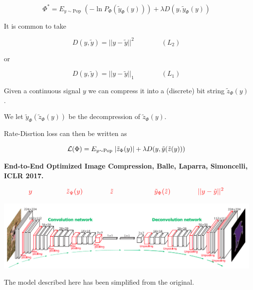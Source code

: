 {

$$\Phi^* = E_{y \sim \mathrm{Pop}}\;(- \ln P_\Phi(\tilde{y}_\Phi(y))) + \lambda D(y,\tilde{y}_\Phi(y))$$

\vfill
It is common to take

$$D(y,\tilde{y}) = ||y-\tilde{y}||^2 \hspace{4em}(L_2)$$

\vfill
or

$$D(y,\tilde{y}) = ||y-\tilde{y}||_1 \hspace{4em} (L_1)$$


Given a continuous signal $y$ we can compress it into a (discrete) bit string $\tilde{z}_\Phi(y)$.

\vfill
We let $\tilde{y}_\Phi(\tilde{z}_\Phi(y))$ be the decompression of $\tilde{z}_\Phi(y)$.

\vfill
Rate-Disrtion loss can then be written as

$${\cal L}(\Phi) = E_{y \sim \mathrm{Pop}}\;|\tilde{z}_\Phi(y)| + \lambda D(y,\tilde{y}(\tilde{z}(y)))$$


{\bf End-to-End Optimized Image Compression, Balle, Laparra, Simoncelli, ICLR 2017.}


\vfill
$${\color{red}y \hspace{5em}  \tilde{z}_\Psi(y) \hspace{4em} \tilde{z} \hspace{6em} \tilde{y}_\Phi(\tilde{z}) \hspace{4em}||y - \tilde{y}||^2}$$
\centerline{\includegraphics[width=9in]{../images/Deconv}}

\vfill
The model described here has been simplified from the original.



}
